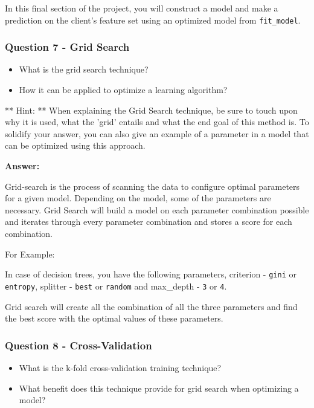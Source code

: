 \documentclass[11pt]{article}
\providecommand{\tightlist}{%
      \setlength{\itemsep}{0pt}\setlength{\parskip}{0pt}}
\begin{document}
In this final section of the project, you will construct a model and
make a prediction on the client's feature set using an optimized model
from \texttt{fit\_model}.

    \subsubsection{Question 7 - Grid Search}\label{question-7---grid-search}

\begin{itemize}
\tightlist
\item
  What is the grid search technique?
\item
  How it can be applied to optimize a learning algorithm?
\end{itemize}

** Hint: ** When explaining the Grid Search technique, be sure to touch
upon why it is used, what the 'grid' entails and what the end goal of
this method is. To solidify your answer, you can also give an example of
a parameter in a model that can be optimized using this approach.

    \textbf{Answer: }

Grid-search is the process of scanning the data to configure optimal
parameters for a given model. Depending on the model, some of the
parameters are necessary. Grid Search will build a model on each
parameter combination possible and iterates through every parameter
combination and stores a score for each combination.

For Example:

In case of decision trees, you have the following parameters, criterion
- \texttt{gini} or \texttt{entropy}, splitter - \texttt{best} or
\texttt{random} and max\_depth - \texttt{3} or \texttt{4}.

Grid search will create all the combination of all the three parameters
and find the best score with the optimal values of these parameters.

    \subsubsection{Question 8 -
Cross-Validation}\label{question-8---cross-validation}

\begin{itemize}
\item
  What is the k-fold cross-validation training technique?
\item
  What benefit does this technique provide for grid search when
  optimizing a model?
\end{itemize}
\end{document}
